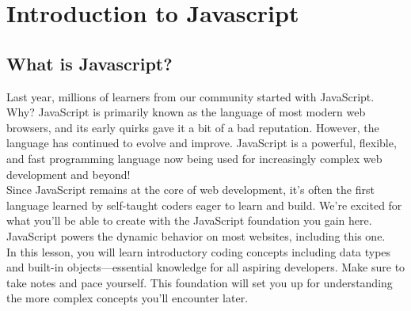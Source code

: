 \documentclass[11pt]{article}
\begin{document}
\section{Introduction to Javascript}
\subsection{What is Javascript? }
Last year, millions of learners from our community started with JavaScript. Why? JavaScript is primarily known as the language of most modern web browsers, and its early quirks gave it a bit of a bad reputation. However, the language has continued to evolve and improve. JavaScript is a powerful, flexible, and fast programming language now being used for increasingly complex web development and beyond! \\
\newline
Since JavaScript remains at the core of web development, it’s often the first language learned by self-taught coders eager to learn and build. We’re excited for what you’ll be able to create with the JavaScript foundation you gain here. JavaScript powers the dynamic behavior on most websites, including this one. \\
\newline
In this lesson, you will learn introductory coding concepts including data types and built-in objects—essential knowledge for all aspiring developers. Make sure to take notes and pace yourself. This foundation will set you up for understanding the more complex concepts you’ll encounter later. 
\end{document}
